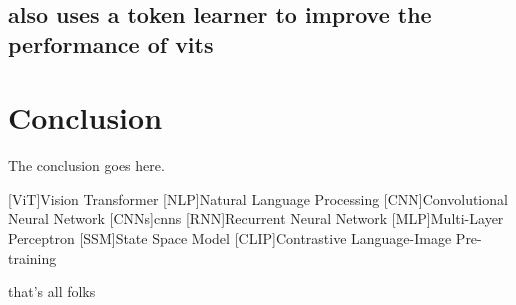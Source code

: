 \documentclass[conference]{IEEEtran}
\begin{document}
  \subsection{\cite{token-learner} also uses a token learner to improve the performance of \ac{vit}s}


  \section{Conclusion}
  The conclusion goes here.

  \printbibliography

  \begin{acronym}
    [ViT]{Vision Transformer}
    [NLP]{Natural Language Processing}
    [CNN]{Convolutional Neural Network}
    [CNNs]{\acp{cnn}}
    [RNN]{Recurrent Neural Network}
    [MLP]{Multi-Layer Perceptron}
    [SSM]{State Space Model}
    [CLIP]{Contrastive Language-Image Pre-training}
  \end{acronym}


that's all folks
\end{document}
